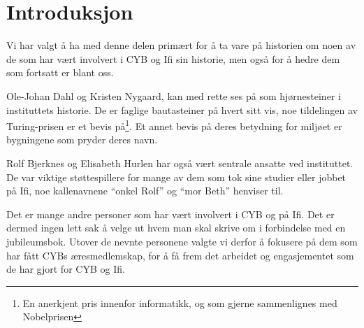 \chapter*{Introduksjon}

\setcounter{footnote}{0}

Vi har valgt å ha med denne delen primært for å ta vare på historien om noen av de som har vært involvert i CYB og Ifi sin historie, men også for å hedre dem som fortsatt er blant oss.

Ole-Johan Dahl og Kristen Nygaard, kan med rette ses på som hjørnesteiner i instituttets historie. De er faglige bautasteiner på hvert sitt vis, noe tildelingen av Turing-prisen er et bevis på\footnote{En anerkjent pris innenfor informatikk, og som gjerne sammenlignes med Nobelprisen}. Et annet bevis på deres betydning for miljøet er bygningene som pryder deres navn.

Rolf Bjerknes og Elisabeth Hurlen har også vært sentrale ansatte ved instituttet. De var viktige støttespillere for mange av dem som tok sine studier eller jobbet på Ifi, noe kallenavnene ``onkel Rolf'' og ``mor Beth'' henviser til.

Det er mange andre personer som har vært involvert i CYB og på Ifi. Det er dermed ingen lett sak å velge ut hvem man skal skrive om i forbindelse med en jubileumsbok. Utover de nevnte personene valgte vi derfor å fokusere på dem som har fått CYBs æresmedlemskap, for å få frem det arbeidet og engasjementet som de har gjort for CYB og Ifi.
